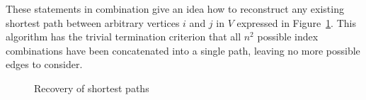 These statements in combination give an idea how to reconstruct any existing shortest path between arbitrary vertices $i$ and $j$ in $V$ expressed in Figure~\ref{alg:recovery}.
This algorithm has the trivial termination criterion that all $n^2$ possible index combinations have been concatenated into a single path, leaving no more possible edges to consider.

\begin{figure}[ht]
    \centering
    \begin{minipage}{.9\textwidth}
        \begin{algorithm}[H]
        \end{algorithm}
    \end{minipage}
    \caption{Recovery of shortest paths\label{alg:recovery}}
\end{figure}
